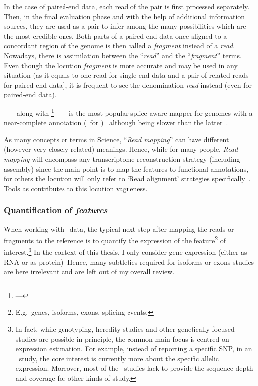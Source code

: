 In the case of paired-end data, each read of the pair is first processed
separately.
Then, in the final evaluation phase and
with the help of additional information sources,
they are used as a pair to infer among the many possibilities which
are the most credible ones.
Both parts of a paired-end data once aligned to a
concordant region of the genome is then called a \emph{fragment} instead of a
\emph{read}. Nowadays, there is assimilation between the \enquote{\emph{read}}
and the \enquote{\emph{fragment}} terms. Even though the locution \emph{fragment}
is more accurate and may be used in any situation (as it equals to one read for
single-end data and a pair of related reads for paired-end data), it is
frequent to see the denomination \emph{read} instead (even for paired-end data).

\toph\ ---
along with \footnote{ ---
}~ ---
is the most popular splice-aware mapper for genomes with a near-complete annotation
(\eg\ for )~
although being slower than the latter~.



As many concepts or terms in Science, \enquote{\emph{Read mapping}} can
have different (however very closely related) meanings.
Hence, while for many people, \emph{Read mapping} will encompass any
transcriptome reconstruction strategy (including  assembly) since
the main point is to map the features to functional annotations,
for others the locution will only refer to
`Read alignment' strategies specifically~.
Tools as  contributes to this locution vagueness.

\subsubsection{Quantification of \emph{features}}\label{subsubsec:rnaseqQuant}

When working with \Rnaseq\ data, the typical next step after mapping the reads or
fragments to the reference is to quantify the expression of the
feature\footnote{E.g.\ genes, isoforms, exons, splicing events.}
of interest.\footnote{In fact, while genotyping, heredity
studies and other genetically focused studies are possible in principle, the common
main focus is centred on expression estimation. For example, instead of
reporting a specific \gls{SNP}, in an \Rnaseq\ study, the core interest is
currently more about the specific allelic expression. Moreover, most of the \Rnaseq\
studies lack to provide the sequence depth and coverage for other kinds of study.}
In the context of this thesis, I only consider gene expression (either as \gls{RNA}
or as protein). Hence, many subtleties required for isoforms or exons studies are
here irrelevant and are left out of my overall review.

